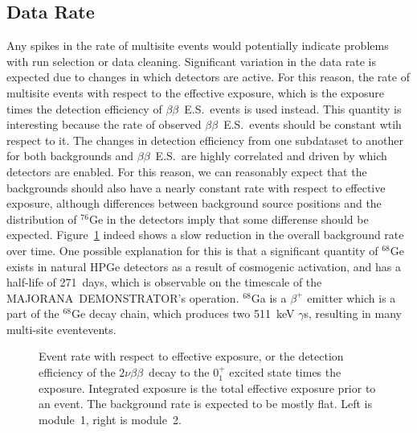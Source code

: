 \documentclass[notitlepage,rmp,aps,10pt]{revtex4-1}
\newcommand{\MJ}{M{\footnotesize AJORANA}}
\newcommand{\Demo}{D{\footnotesize EMON\-STRAT\-OR}}
\newcommand{\MJD}{\MJ\ \Demo}
\newcommand{\bb}{${\beta \beta}$}
\newcommand{\tnbb}{${2 \nu \beta \beta}$}
\newcommand{\bbes}{\bb~E.S.}
\newcommand{\iso}[2]{$^{#1}$#2}
\newcommand{\Ge}[1]{\iso{#1}{Ge}}
\newcommand{\SP}[3]{$#1^{#2}_{#3}$}
\newcommand{\msmd}{multi-site event}
\begin{document}
\subsection{Data Rate}
Any spikes in the rate of multisite events would potentially indicate problems with run selection or data cleaning.
Significant variation in the data rate is expected due to changes in which detectors are active.
For this reason, the rate of multisite events with respect to the effective exposure, which is the exposure times the detection efficiency of \bbes\ events is used instead.
This quantity is interesting because the rate of observed \bbes\ events should be constant wtih respect to it.
The changes in detection efficiency from one subdataset to another for both backgrounds and \bbes\ are highly correlated and driven by which detectors are enabled.
For this reason, we can reasonably expect that the backgrounds should also have a nearly constant rate with respect to effective exposure, although differences between background source positions and the distribution of \Ge{76} in the detectors imply that some differense should be expected.
Figure~\ref{fig:eventrate} indeed shows a slow reduction in the overall background rate over time.
One possible explanation for this is that a significant quantity of \Ge{68} exists in natural HPGe detectors as a result of cosmogenic activation, and has a half-life of 271~days, which is observable on the timescale of the \MJD's operation.
\iso{68}{Ga} is a $\beta^+$ emitter which is a part of the \Ge{68} decay chain, which produces two 511~keV $\gamma$s, resulting in many \msmd events.
\begin{figure}[ht]
  \centering
  \caption[Event rate in both modules with respect to effective exposure]{\label{fig:eventrate}
    Event rate with respect to effective exposure, or the detection efficiency of the \tnbb\ decay to the \SP{0}{+}{1} excited state times the exposure. Integrated exposure is the total effective exposure prior to an event. The background rate is expected to be mostly flat. Left is module~1, right is module~2.
  }
\end{figure}
\end{document}
